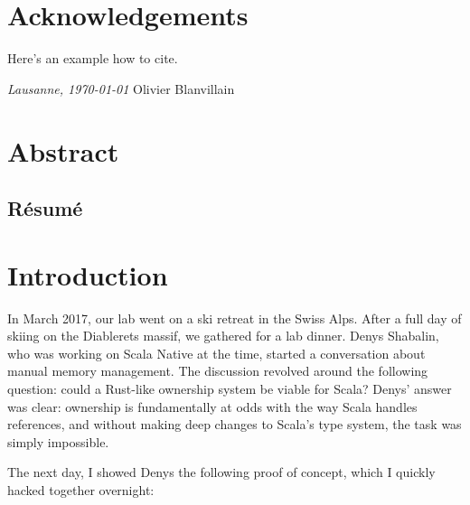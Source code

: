 



\frontmatter

\setcounter{page}{0}

\chapter{Acknowledgements}
\lipsum[1-2]
Here's an example how to cite.

\bigskip
\noindent\textit{Lausanne, \today}
\hfill Olivier Blanvillain

\cleardoublepage
\chapter*{Abstract}
\lipsum[1-2] %
\begin{otherlanguage}{french}
\cleardoublepage
\chapter*{Résumé}
\lipsum[1-2]
\end{otherlanguage}

\tableofcontents

\cleardoublepage
{}
{}
\listoffigures
\mainmatter


\chapter{Introduction}

In March 2017, our lab went on a ski retreat in the Swiss Alps.
After a full day of skiing on the Diablerets massif, we gathered for a lab dinner.
Denys Shabalin, who was working on Scala Native \cite{shabalin2020just} at the time, started a conversation about manual memory management.
The discussion revolved around the following question: could a Rust-like ownership system be viable for Scala?
Denys' answer was clear: ownership is fundamentally at odds with the way Scala handles references, and without making deep changes to Scala's type system, the task was simply impossible.

The next day, I showed Denys the following proof of concept, which I quickly hacked together overnight:

